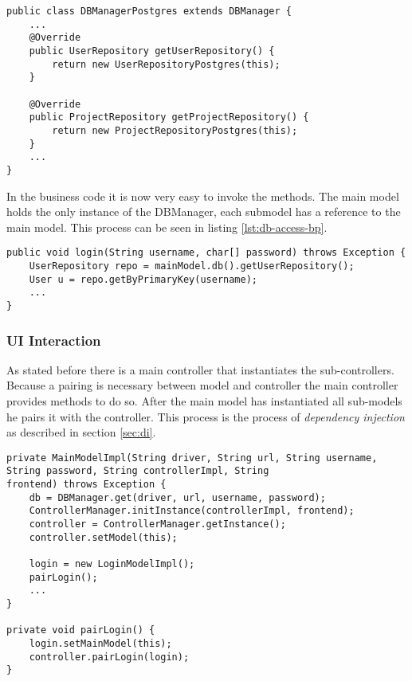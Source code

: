 \begin{lstlisting}[caption={Code snippet on how a DBManager implementation instantiates its repositories.}, captionpos=b]
public class DBManagerPostgres extends DBManager {
	...
	@Override
	public UserRepository getUserRepository() {
		return new UserRepositoryPostgres(this);
	}
	
	@Override
	public ProjectRepository getProjectRepository() {
		return new ProjectRepositoryPostgres(this);
	}
	...
}
\end{lstlisting}

In the business code it is now very easy to invoke the methods. The main model holds the only instance of the DBManager, each submodel has a reference to the main model. This process can be seen in listing \ref{lst:db-access-bp}.

\begin{lstlisting}[caption={Code snippet showing how repositories are used in business code. The main model holds the single instance of the DBManager. Each sub-model accesses it by using a getter-method.}, captionpos=b, label={lst:db-access-bp}]
public void login(String username, char[] password) throws Exception {
	UserRepository repo = mainModel.db().getUserRepository();
	User u = repo.getByPrimaryKey(username);
	...
}
\end{lstlisting}

\subsubsection{UI Interaction}
As stated before there is a main controller that instantiates the sub-controllers. Because a pairing is necessary between model and controller the main controller provides methods to do so. After the main model has instantiated all sub-models he pairs it with the controller. This process is the process of \emph{dependency injection} as described in section \ref{sec:di}.

\begin{lstlisting}[caption={Code snippet showing initialization code for the controller. The main model retrieves the main controller by calling a getter which is similarily implemented as the DBManager class shown in listing \ref{lst:dbmanager}. After that he calls a method that pairs the sub-model with the sub-controller, a code snippet showing this process can be seen in listing \ref{lst:pairing}.}, captionpos=b, label={lst:db-manager-mono}]
private MainModelImpl(String driver, String url, String username, String password, String controllerImpl, String
frontend) throws Exception {
	db = DBManager.get(driver, url, username, password);
	ControllerManager.initInstance(controllerImpl, frontend);
	controller = ControllerManager.getInstance();
	controller.setModel(this);
	
	login = new LoginModelImpl();
	pairLogin();
	...
}

private void pairLogin() {
	login.setMainModel(this);
	controller.pairLogin(login);
}

\end{lstlisting}

